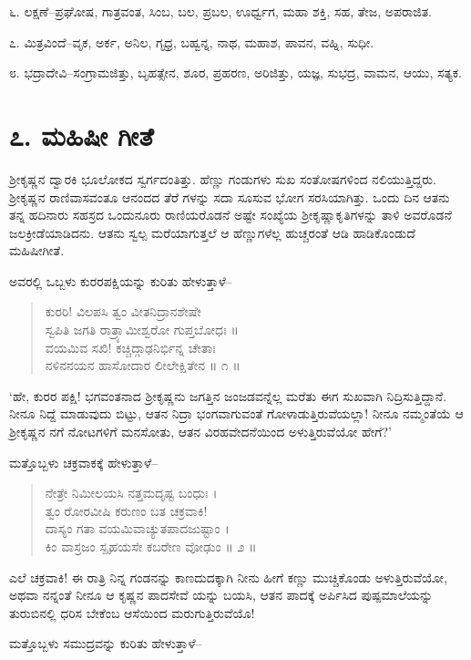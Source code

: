 ೬. ಲಕ್ಷಣೆ–ಪ್ರಘೋಷ, ಗಾತ್ರವಂತ, ಸಿಂಬ, ಬಲ, ಪ್ರಬಲ, ಊರ್ಧ್ವಗ, ಮಹಾ ಶಕ್ತಿ, ಸಹ, ತೇಜ, ಅಪರಾಜಿತ.

೭. ಮಿತ್ರವಿಂದೆ–ವೃಕ, ಅರ್ಕ, ಅನಿಲ, ಗೃಧ್ರ, ಬಹ್ವನ್ನ, ನಾಥ, ಮಹಾಶ, ಪಾವನ, ವಹ್ನಿ, ಸುಧೀ.

೮. ಭದ್ರಾದೇವಿ–ಸಂಗ್ರಾಮಜಿತ್ತು, ಬೃಹತ್ಸೇನ, ಶೂರ, ಪ್ರಹರಣ, ಅರಿಜಿತ್ತು, ಯಜ್ಞ, ಸುಭದ್ರ, ವಾಮನ, ಆಯು, ಸತ್ಯಕ.


\section{೭. ಮಹಿಷೀ ಗೀತೆ}

ಶ್ರೀಕೃಷ್ಣನ ದ್ವಾರಕಿ ಭೂಲೋಕದ ಸ್ವರ್ಗದಂತಿತ್ತು. ಹೆಣ್ಣು ಗಂಡುಗಳು ಸುಖ ಸಂತೋಷಗಳಿಂದ ನಲಿಯುತ್ತಿದ್ದರು. ಶ್ರೀಕೃಷ್ಣನ ರಾಣಿವಾಸವಂತೂ ಆನಂದದ ತೆರೆ ಗಳನ್ನು ಸದಾ ಸೂಸುವ ಭೋಗ ಸರಸಿಯಾಗಿತ್ತು. ಒಂದು ದಿನ ಆತನು ತನ್ನ ಹದಿನಾರು ಸಹಸ್ರದ ಒಂದುನೂರು ರಾಣಿಯರೊಡನೆ ಅಷ್ಟೇ ಸಂಖ್ಯೆಯ ಶ್ರೀಕೃಷ್ಣಾಕೃತಿಗಳನ್ನು ತಾಳಿ ಅವರೊಡನೆ ಜಲಕ್ರೀಡೆಯಾಡಿದನು. ಆತನು ಸ್ವಲ್ಪ ಮರೆಯಾಗುತ್ತಲೆ ಆ ಹೆಣ್ಣುಗಳೆಲ್ಲ ಹುಚ್ಚರಂತೆ ಆಡಿ ಹಾಡಿಕೊಂಡುದೆ ಮಹಿಷೀಗೀತೆ.

ಅವರಲ್ಲಿ ಒಬ್ಬಳು ಕುರರಪಕ್ಷಿಯನ್ನು ಕುರಿತು ಹೇಳುತ್ತಾಳೆ–

\begin{verse}
ಕುರರಿ! ವಿಲಪಸಿ ತ್ವಂ ವೀತನಿದ್ರಾನಶೇಷೇ\\ಸ್ವಪಿತಿ ಜಗತಿ ರಾತ್ರ್ಯಾಮೀಶ್ವರೋ ಗುಪ್ತಬೋಧಃ ॥\\ವಯಮಿವ ಸಖಿ! ಕಚ್ಚಿದ್ಗಾಢನಿರ್ಭಿನ್ನ ಚೇತಾಃ \\ನಳಿನನಯನ ಹಾಸೋದಾರ ಲೀಲೇಕ್ಷಿತೇನ \num{॥ ೧ ॥}
\end{verse}

‘ಹೇ, ಕುರರ ಪಕ್ಷಿ! ಭಗವಂತನಾದ ಶ್ರೀಕೃಷ್ಣನು ಜಗತ್ತಿನ ಜಂಜಡವನ್ನೆಲ್ಲ ಮರೆತು ಈಗ ಸುಖವಾಗಿ ನಿದ್ರಿಸುತ್ತಿದ್ದಾನೆ. ನೀನೂ ನಿದ್ದೆ ಮಾಡುವುದು ಬಿಟ್ಟು, ಆತನ ನಿದ್ರಾ ಭಂಗವಾಗುವಂತೆ ಗೋಳಾಡುತ್ತಿರುವೆಯಲ್ಲಾ! ನೀನೂ ನಮ್ಮಂತೆಯೆ ಆ ಶ್ರೀಕೃಷ್ಣನ ನಗೆ ನೋಟಗಳಿಗೆ ಮನಸೋತು, ಆತನ ವಿರಹವೇದನೆಯಿಂದ ಅಳುತ್ತಿರುವೆಯೋ ಹೇಗೆ?’

ಮತ್ತೊಬ್ಬಳು ಚಕ್ರವಾಕಕ್ಕೆ ಹೇಳುತ್ತಾಳೆ–

\begin{verse}
ನೇತ್ರೇ ನಿಮೀಲಯಸಿ ನತ್ತಮದೃಷ್ಟ ಬಂಧುಃ ।\\ತ್ವಂ ರೋರವೀಷಿ ಕರುಣಂ ಬತ ಚಕ್ರವಾಕಿ!\\ದಾಸ್ಯಂ ಗತಾ ವಯಮಿವಾಚ್ಯುತಪಾದಜುಷ್ಟಾಂ ।\\ಕಿಂ ವಾಸ್ರಜಂ ಸ್ಪೃಹಯಸೇ ಕಬರೇಣ ವೋಢುಂ \num{॥ ೨ ॥}
\end{verse}

ಎಲೆ ಚಕ್ರವಾಕಿ! ಈ ರಾತ್ರಿ ನಿನ್ನ ಗಂಡನನ್ನು ಕಾಣದುದಕ್ಕಾಗಿ ನೀನು ಹೀಗೆ ಕಣ್ಣು ಮುಚ್ಚಿಕೊಂಡು ಅಳುತ್ತಿರುವೆಯೋ, ಅಥವಾ ನನ್ನಂತೆ ನೀನೂ ಆ ಕೃಷ್ಣನ ಪಾದಸೇವೆ ಯನ್ನು ಬಯಸಿ, ಆತನ ಪಾದಕ್ಕೆ ಅರ್ಪಿಸಿದ ಪುಷ್ಪಮಾಲೆಯನ್ನು ತುರುಬಿನಲ್ಲಿ ಧರಿಸ ಬೇಕೆಂಬ ಆಸೆಯಿಂದ ಮರುಗುತ್ತಿರುವೆಯೊ!

ಮತ್ತೊಬ್ಬಳು ಸಮುದ್ರವನ್ನು ಕುರಿತು ಹೇಳುತ್ತಾಳೆ–

